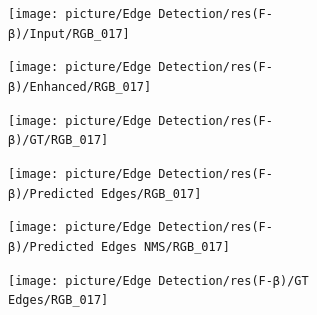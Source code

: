 \documentclass[a4paper]{ctexart}
\begin{document}
\begin{figure}[htbp]
			\begin{subfigure}{0.16\textwidth}
				\texttt{[image: picture/Edge Detection/res(F-β)/Input/RGB\_017]}
				\captionsetup{font=scriptsize}
				\label{fig: RGB_017}
			\end{subfigure}
			\begin{subfigure}{0.16\textwidth}
				\texttt{[image: picture/Edge Detection/res(F-β)/Enhanced/RGB\_017]}
				\captionsetup{font=scriptsize}
				\label{fig: RGB_017 Enhanced}
			\end{subfigure}
			\begin{subfigure}{0.16\textwidth}
				\texttt{[image: picture/Edge Detection/res(F-β)/GT/RGB\_017]}
				\captionsetup{font=scriptsize}
				\label{fig: RGB_017 GT}
			\end{subfigure}
			\begin{subfigure}{0.16\textwidth}
				\texttt{[image: picture/Edge Detection/res(F-β)/Predicted Edges/RGB\_017]}
				\captionsetup{font=scriptsize}
				\label{fig: RGB_017 Pred}
			\end{subfigure}
			\begin{subfigure}{0.16\textwidth}
				\texttt{[image: picture/Edge Detection/res(F-β)/Predicted Edges NMS/RGB\_017]}
				\captionsetup{font=scriptsize}
				\label{fig: RGB_017 Pred NMS}
			\end{subfigure}
			\begin{subfigure}{0.16\textwidth}
				\texttt{[image: picture/Edge Detection/res(F-β)/GT Edges/RGB\_017]}
				\captionsetup{font=scriptsize}
				\label{fig: RGB_017 GT Edges}
			\end{subfigure} \\
			
			\vspace{-10pt}
			

\end{figure}
\end{document}

